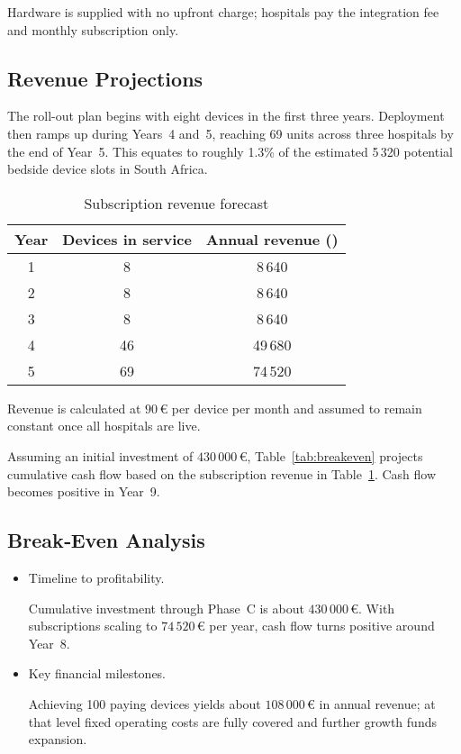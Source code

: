 \documentclass[a4paper,11pt]{article}
\begin{document}
Hardware is supplied with no upfront charge; hospitals pay the integration fee and monthly subscription only.

\subsection{Revenue Projections}
The roll-out plan begins with eight devices in the first three years. Deployment then ramps up during Years~4 and~5, reaching 69 units across three hospitals by the end of Year~5. This equates to roughly 1.3\% of the estimated 5\,320 potential bedside device slots in South Africa.

\begin{table}[H]
\centering
\caption{Subscription revenue forecast}
\label{tab:revenue}
\begin{tabularx}{\linewidth}{c c c}
\toprule
Year & Devices in service & Annual revenue (\texteuro{}) \\
\midrule
1 & 8 & 8\,640 \\
2 & 8 & 8\,640 \\
3 & 8 & 8\,640 \\
4 & 46 & 49\,680 \\
5 & 69 & 74\,520 \\
\bottomrule
\end{tabularx}
\end{table}

Revenue is calculated at \(90\,\text{€}\) per device per month and assumed to remain constant once all hospitals are live.

Assuming an initial investment of \(430\,000\,\text{€}\), Table~\ref{tab:breakeven} projects cumulative cash flow based on the subscription revenue in Table~\ref{tab:revenue}. Cash flow becomes positive in Year~9.


\subsection{Break‐Even Analysis}
\begin{itemize}
  \item Timeline to profitability. 
  
  Cumulative investment through Phase~C is about \(430\,000\,\text{€}\). With subscriptions scaling to \(74\,520\,\text{€}\) per year, cash flow turns positive around Year~8.
  \item Key financial milestones. 
  
  Achieving 100 paying devices yields about \(108\,000\,\text{€}\) in annual revenue; at that level fixed operating costs are fully covered and further growth funds expansion.
\end{itemize}
\end{document}
